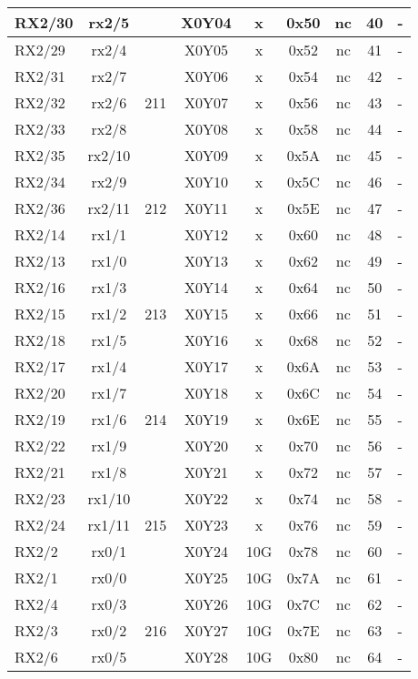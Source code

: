 \begin{longtable}{|l|c|c|c|c|c|c|c|l|}
RX2/30 & rx2/5  &     & X0Y04 &  x  & 0x50 & nc & 40 & -\\\hline
RX2/29 & rx2/4  &     & X0Y05 &  x  & 0x52 & nc & 41 & -\\\hline
RX2/31 & rx2/7  &     & X0Y06 &  x  & 0x54 & nc & 42 & -\\\hline
RX2/32 & rx2/6  & 211 & X0Y07 &  x  & 0x56 & nc & 43 & -\\\hline
RX2/33 & rx2/8  &     & X0Y08 &  x  & 0x58 & nc & 44 & -\\\hline
RX2/35 & rx2/10 &     & X0Y09 &  x  & 0x5A & nc & 45 & -\\\hline
RX2/34 & rx2/9  &     & X0Y10 &  x  & 0x5C & nc & 46 & -\\\hline
RX2/36 & rx2/11 & 212 & X0Y11 &  x  & 0x5E & nc & 47 & -\\\hline
RX2/14 & rx1/1  &     & X0Y12 &  x  & 0x60 & nc & 48 & -\\\hline
RX2/13 & rx1/0  &     & X0Y13 &  x  & 0x62 & nc & 49 & -\\\hline
RX2/16 & rx1/3  &     & X0Y14 &  x  & 0x64 & nc & 50 & -\\\hline
RX2/15 & rx1/2  & 213 & X0Y15 &  x  & 0x66 & nc & 51 & -\\\hline
RX2/18 & rx1/5  &     & X0Y16 &  x  & 0x68 & nc & 52 & -\\\hline
RX2/17 & rx1/4  &     & X0Y17 &  x  & 0x6A & nc & 53 & -\\\hline
RX2/20 & rx1/7  &     & X0Y18 &  x  & 0x6C & nc & 54 & -\\\hline
RX2/19 & rx1/6  & 214 & X0Y19 &  x  & 0x6E & nc & 55 & -\\\hline
RX2/22 & rx1/9  &     & X0Y20 &  x  & 0x70 & nc & 56 & -\\\hline
RX2/21 & rx1/8  &     & X0Y21 &  x  & 0x72 & nc & 57 & -\\\hline
RX2/23 & rx1/10 &     & X0Y22 &  x  & 0x74 & nc & 58 & -\\\hline
RX2/24 & rx1/11 & 215 & X0Y23 &  x  & 0x76 & nc & 59 & -\\\hline
RX2/2  & rx0/1  &     & X0Y24 & 10G & 0x78 & nc & 60 & -\\\hline
RX2/1  & rx0/0  &     & X0Y25 & 10G & 0x7A & nc & 61 & -\\\hline
RX2/4  & rx0/3  &     & X0Y26 & 10G & 0x7C & nc & 62 & -\\\hline
RX2/3  & rx0/2  & 216 & X0Y27 & 10G & 0x7E & nc & 63 & -\\\hline
RX2/6  & rx0/5  &     & X0Y28 & 10G & 0x80 & nc & 64 & -\\\hline

\end{longtable}
